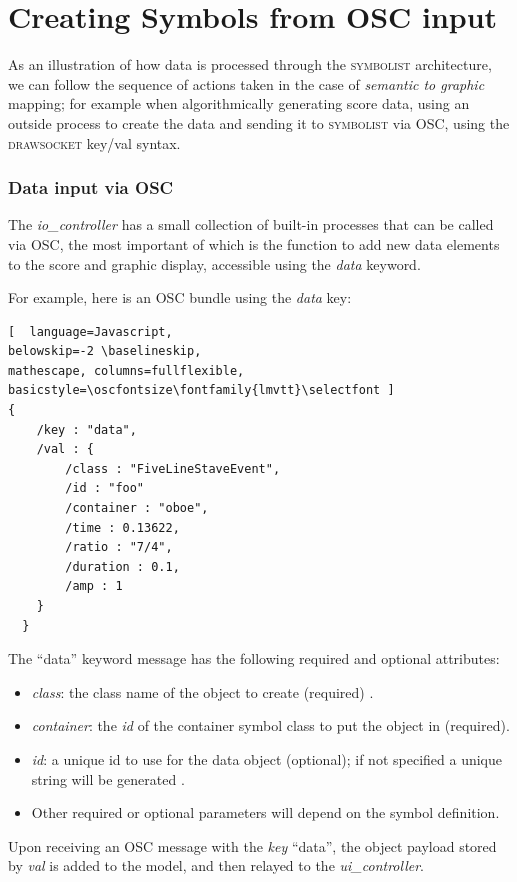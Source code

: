 \documentclass{article}
\def\symbolist{\textsc{symbolist}\xspace}
\def\drawsocket{\textsc{drawsocket}\xspace}
\def\uicontroller{\textit{ui\_controller}\xspace}
\def\iocontroller{\textit{io\_controller}\xspace}
\def\oscfontsize{\tiny}
\begin{document}
\section{Creating Symbols from OSC input}\label{sec:osc_input}

As an illustration of how data is processed through the \symbolist architecture, we can follow the sequence of actions taken in the case of \textit{semantic to graphic} mapping; for example when algorithmically generating score data, using an outside process to create the data and sending it to \symbolist via OSC, using the \drawsocket key/val syntax.

\subsubsection*{Data input via OSC}
The \iocontroller has a small collection of built-in processes that can be called via OSC, the most important of which is the function to add new data elements to the score and graphic display, accessible using the \textit{data} keyword.

For example, here is an OSC bundle using the \textit{data} key:
\begin{lstlisting}[  language=Javascript, 
belowskip=-2 \baselineskip,
mathescape, columns=fullflexible, basicstyle=\oscfontsize\fontfamily{lmvtt}\selectfont ]
{
    /key : "data",
    /val : {
        /class : "FiveLineStaveEvent",
        /id : "foo"
        /container : "oboe",
        /time : 0.13622,
        /ratio : "7/4",
        /duration : 0.1,
        /amp : 1
    }
  }
\end{lstlisting}

The ``data'' keyword message has the following required and optional attributes:
\begin{itemize}\itemsep0pt 
  \item \textit{class}: the class name of the object to create (required) .
  \item \textit{container}: the \textit{id} of the container symbol class to put the object in (required).
   \item \textit{id}: a unique id to use for the data object (optional); if not specified a unique string will be generated .
  \item Other required or optional parameters will depend on the symbol definition.
\end{itemize}

Upon receiving an OSC message with the \textit{key} ``data'', the object payload stored by \textit{val} is added to the model, and then relayed to the \uicontroller.
\end{document}
